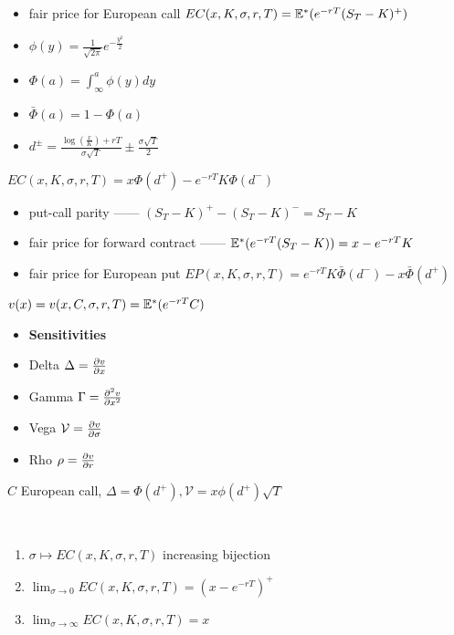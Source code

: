 \begin{itemize}
    \item fair price for European call $EC(x, K, \sigma, r, T) = \mathbb{E}^*(e^{-rT}(S_T - K)^+)$
    \item $\phi(y) = \frac{1}{\sqrt{2\pi}}e^{-\frac{y^2}{2}}$
    \item $\Phi(a) = \int^a_\infty \phi(y) dy$
    \item $\bar\Phi(a) = 1 - \Phi(a)$
    \item $d^{\pm} = \frac{\log(\frac{x}{K}) + rT}{\sigma\sqrt{T}} \pm \frac{\sigma \sqrt{T}}{2}$
\end{itemize}

\begin{prop}
    $EC(x, K, \sigma, r, T) = x\Phi(d^+) - e^{-rT}K\Phi(d^-)$
\end{prop}

\begin{itemize}
    \item put-call parity ------ $(S_T - K)^+ - (S_T - K)^- = S_T - K$
    \item fair price for forward contract ------ $\mathbb{E}^*(e^{-rT}(S_T - K)) = x - e^{-rT}K$
    \item fair price for European put $EP(x, K, \sigma, r, T) = e^{-rT}K\bar\Phi(d^-) - x\bar\Phi(d^+)$
\end{itemize}

\begin{setting}
    $v(x) = v(x, C, \sigma, r, T) = \mathbb{E}^*(e^{-rT}C)$
\end{setting}

\begin{itemize}
    \item \textbf{Sensitivities}
    \item Delta $\Delta = \pdv{v}{x}$
    \item Gamma $\Gamma = \pdv[2]{v}{x}$
    \item Vega $\mathcal{V} = \pdv{v}{\sigma}$
    \item Rho $\rho = \pdv{v}{r}$
\end{itemize}

\begin{example}
    $C$ European call, $\Delta = \Phi(d^+), \mathcal{V} = x\phi(d^+)\sqrt{T}$
\end{example}

\begin{prop}\,
    \begin{enumerate}
        \item $\sigma \mapsto EC(x, K, \sigma, r, T)$ increasing bijection
        \item $\lim_{\sigma \rightarrow 0}EC(x, K, \sigma, r, T) = (x - e^{-rT})^+$
        \item $\lim_{\sigma \rightarrow \infty}EC(x, K, \sigma, r, T) = x$
    \end{enumerate}
\end{prop}

